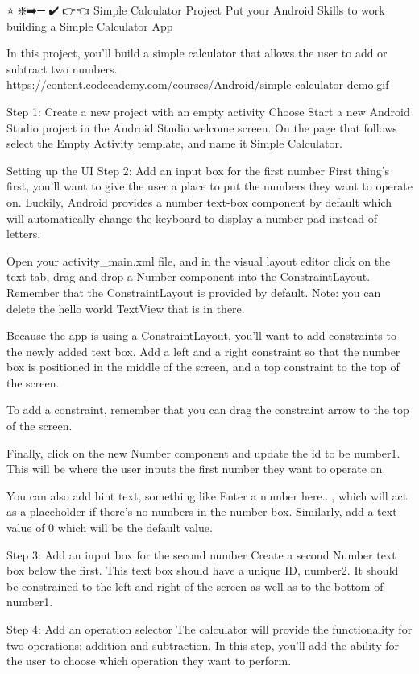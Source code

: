 ⭐🎨❇️➡️➖💎✔️🔗👉👈
Simple Calculator Project
        Put your Android Skills to work building a Simple Calculator App

        In this project, you’ll build a simple calculator that allows the user to add or subtract two numbers.
            🎨https://content.codecademy.com/courses/Android/simple-calculator-demo.gif

    Step 1: Create a new project with an empty activity
        Choose Start a new Android Studio project in the Android Studio welcome screen. On the page that follows select the Empty Activity template, and name it Simple Calculator.

Setting up the UI
    Step 2: Add an input box for the first number
        First thing’s first, you’ll want to give the user a place to put the numbers they want to operate on. Luckily, Android provides a number text-box component by default which will automatically change the keyboard to display a number pad instead of letters.

        Open your activity_main.xml file, and in the visual layout editor click on the text tab, drag and drop a Number component into the ConstraintLayout. Remember that the ConstraintLayout is provided by default. Note: you can delete the hello world TextView that is in there.

        Because the app is using a ConstraintLayout, you’ll want to add constraints to the newly added text box. Add a left and a right constraint so that the number box is positioned in the middle of the screen, and a top constraint to the top of the screen.

        To add a constraint, remember that you can drag the constraint arrow to the top of the screen.

        Finally, click on the new Number component and update the id to be number1. This will be where the user inputs the first number they want to operate on.

        You can also add hint text, something like Enter a number here..., which will act as a placeholder if there’s no numbers in the number box. Similarly, add a text value of 0 which will be the default value.

    Step 3: Add an input box for the second number
        Create a second Number text box below the first. This text box should have a unique ID, number2. It should be constrained to the left and right of the screen as well as to the bottom of number1.

    Step 4: Add an operation selector
        The calculator will provide the functionality for two operations: addition and subtraction. In this step, you’ll add the ability for the user to choose which operation they want to perform.

